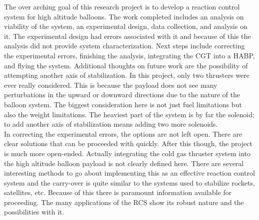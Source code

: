 The over arching goal of this research project is to develop a reaction control system for high altitude balloons. The work completed includes an analysis on viability of the system, an experimental design, data collection, and analysis on it. The experimental design had errors associated with it and because of this the analysis did not provide system characterization. Next steps include correcting the experimental errors, finishing the analysis, integrating the CGT into a HABP, and flying the system. Additional thoughts on future work are the possibility of attempting another axis of stabilization. In this project, only two thrusters were ever really considered. This is because the payload does not see many perturbations in the upward or downward directions due to the nature of the balloon system. The biggest consideration here is not just fuel limitations but also the weight limitations. The heaviest part of the system is by far the solenoid; to add another axis of stabilization means adding two more solenoids. \\
In correcting the experimental errors, the options are not left open. There are clear solutions that can be proceeded with quickly. After this though, the project is much more open-ended. Actually integrating the cold gas thruster system into the high altitude balloon payload is not clearly defined here. There are several interesting methods to go about implementing this as an effective reaction control system and the carry-over is quite similar to the systems used to stabilize rockets, satellites, etc. Because of this there is paramount information available for proceeding. The many applications of the RCS show its robust nature and the possibilities with it.